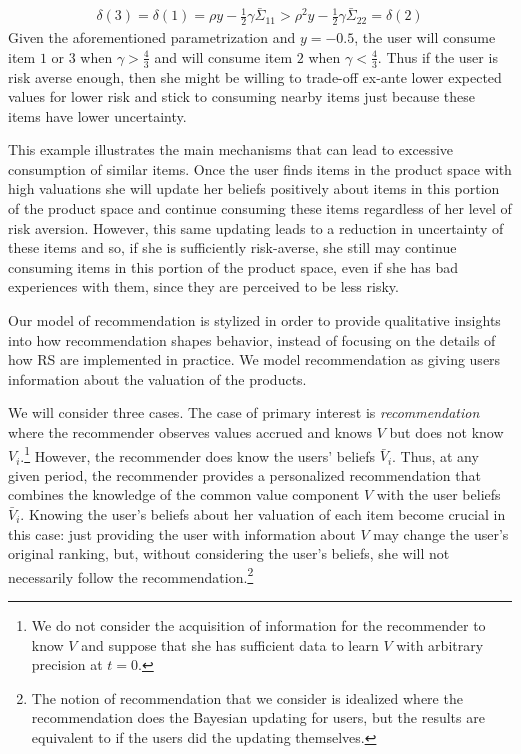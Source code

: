 \documentclass[manuscript]{acmart}
\newcommand{\xhdr}[1]{\vspace{1mm} \noindent{\bf #1}}
\begin{document}
\begin{align*}
\delta(3) = \delta(1) = \rho y - \frac{1}{2} \gamma \bar{\Sigma}_{11} > \rho^{2} y - \frac{1}{2} \gamma \bar{\Sigma}_{22} = \delta(2)
\end{align*}
Given the aforementioned parametrization and $y = -0.5$, the user will consume item $1$ or $3$ when $\gamma > \frac{4}{3}$ and will consume item $2$ when $\gamma < \frac{4}{3}$. Thus if the user is risk averse enough, then she might be willing to trade-off ex-ante lower expected values for lower risk and stick to consuming nearby items just because these items have lower uncertainty. 
\par 
This example illustrates the main mechanisms that can lead to excessive consumption of similar items. Once the user finds items in the product space with high valuations she will update her beliefs positively about items in this portion of the product space and continue consuming these items regardless of her level of risk aversion. However, this same updating leads to a reduction in uncertainty of these items and so, if she is sufficiently risk-averse, she still may continue consuming items in this portion of the product space, even if she has bad experiences with them, since they are perceived to be less risky. 
\par

\xhdr{Recommendation.}
Our model of recommendation is stylized in order to provide qualitative insights into how recommendation shapes behavior, instead of focusing on the details of how RS are implemented in practice. We model recommendation as giving users information about the valuation of the products.
\par

We will consider three cases. The case of primary interest is \textit{recommendation} where the recommender observes values accrued and knows $V$ but does not know $V_i$.\footnote{We do not consider the acquisition of information for the recommender to know $V$ and suppose that she has sufficient data to learn $V$ with arbitrary precision at $t = 0$.} However, the recommender does know the users' beliefs $\bar V_i$. Thus, at any given period, the recommender provides a personalized recommendation that combines the knowledge of the common value component $V$ with the user beliefs $\bar V_i$. Knowing the user's beliefs about her valuation of each item become crucial in this case: just providing the user with information about $V$ may change the user's original ranking, but, without considering the user's beliefs, she will not necessarily follow the recommendation.\footnote{The notion of recommendation that we consider is idealized where the recommendation does the Bayesian updating for users, but the results are equivalent to if the users did the updating themselves.}
\par
\end{document}
